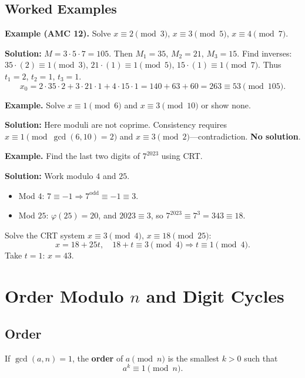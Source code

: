 \documentclass[12pt]{extarticle}
\begin{document}
\subsection*{Worked Examples}

\begin{examplebox}
	\textbf{Example (AMC 12).} Solve $x\equiv 2\pmod3$, $x\equiv 3\pmod5$, $x\equiv 4\pmod7$.
\end{examplebox}

	\textbf{Solution:}
$M=3\cdot5\cdot7=105$. Then $M_1=35$, $M_2=21$, $M_3=15$.
Find inverses: $35\cdot(2)\equiv1\pmod3$, $21\cdot(1)\equiv1\pmod5$, $15\cdot(1)\equiv1\pmod7$.
Thus $t_1=2$, $t_2=1$, $t_3=1$.
\[
x_0=2\cdot35\cdot2+3\cdot21\cdot1+4\cdot15\cdot1=140+63+60=263\equiv\boxed{53}\pmod{105}.
\]

\begin{examplebox}
\textbf{Example.} Solve $x\equiv 1\pmod{6}$ and $x\equiv 3\pmod{10}$ or show none.
\end{examplebox}

	\textbf{Solution:} Here moduli are not coprime. Consistency requires $x\equiv1\pmod{\gcd(6,10)=2}$ and $x\equiv3\pmod{2}$—contradiction. \textbf{No solution}.

\begin{examplebox}
	\textbf{Example.} Find the last two digits of $7^{2023}$ using CRT.
\end{examplebox}

		\textbf{Solution:} Work modulo $4$ and $25$.
\begin{itemize}
\item Mod $4$: $7\equiv -1 \Rightarrow 7^{\text{odd}}\equiv -1\equiv 3$.
\item Mod $25$: $\varphi(25)=20$, and $2023\equiv 3$, so $7^{2023}\equiv 7^3=343\equiv 18$.
\end{itemize}
Solve the CRT system $x\equiv 3\pmod4$, $x\equiv 18\pmod{25}$:
\[
x=18+25t,\quad 18+t\equiv 3\pmod4 \Rightarrow t\equiv 1\pmod4.
\]
Take $t=1$: $x=43$.


\section{Order Modulo \texorpdfstring{$n$}{n} and Digit Cycles}

\subsection*{Order}
If $\gcd(a,n)=1$, the \textbf{order} of $a\pmod n$ is the smallest $k>0$ such that
\[
a^k\equiv1\pmod n.
\]
\end{document}

